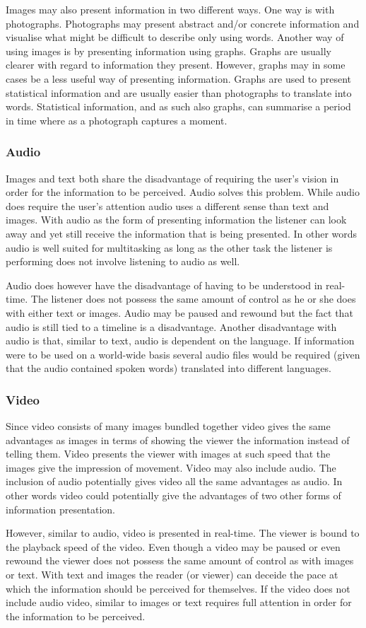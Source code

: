 Images may also present information in two different ways. One way is with photographs. Photographs may present abstract and/or concrete information and visualise what might be difficult to describe only using words. Another way of using images is by presenting information using graphs. Graphs are usually clearer with regard to information they present. However, graphs may in some cases be a less useful way of presenting information. Graphs are used to present statistical information and are usually easier than photographs to translate into words. Statistical information, and as such also graphs, can summarise a period in time where as a photograph captures a moment. 

\subsubsection{Audio}
Images and text both share the disadvantage of requiring the user's vision in order for the information to be perceived. Audio solves this problem. While audio does require the user's attention audio uses a different sense than text and images. With audio as the form of presenting information the listener can look away and yet still receive the information that is being presented. In other words audio is well suited for multitasking as long as the other task the listener is performing does not involve listening to audio as well.

Audio does however have the disadvantage of having to be understood in real-time. The listener does not possess the same amount of control as he or she does with either text or images. Audio may be paused and rewound but the fact that audio is still tied to a timeline is a disadvantage. Another disadvantage with audio is that, similar to text, audio is dependent on the language. If information were to be used on a world-wide basis several audio files would be required (given that the audio contained spoken words) translated into different languages.

\subsubsection{Video}
Since video consists of many images bundled together video gives the same advantages as images in terms of showing the viewer the information instead of telling them. Video presents the viewer with images at such speed that the images give the impression of movement. Video may also include audio. The inclusion of audio potentially gives video all the same advantages as audio. In other words video could potentially give the advantages of two other forms of information presentation.

However, similar to audio, video is presented in real-time. The viewer is bound to the playback speed of the video. Even though a video may be paused or even rewound the viewer does not possess the same amount of control as with images or text. With text and images the reader (or viewer) can deceide the pace at which the information should be perceived for themselves. If the video does not include audio video, similar to images or text requires full attention in order for the information to be perceived.